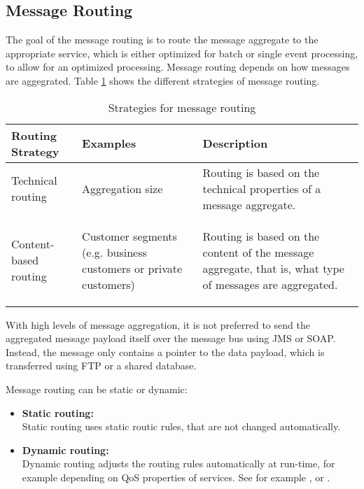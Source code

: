 \subsection{Message Routing}
\label{sec:ch05_router}

The goal of the message routing is to route the message aggregate to the appropriate service, which is either optimized for batch or single event processing, to allow for an optimized processing. Message routing depends on how messages are aggegrated. Table \ref{table:ch05_message_routing} shows the different strategies of message routing.

\begin{table}[htbp]
	\centering
	\begin{tabularx}{\textwidth}{@{} p{3cm} X X @{}}
		\caption{Strategies for message routing}\label{table:ch05_message_routing}\\
		\toprule
		\bfseries Routing Strategy & \bfseries Examples & \bfseries Description\\
		\midrule
		Technical routing & \savespace
		\begin{titemize}
			\item Aggregation size
		\end{titemize} & Routing is based on the technical properties of a message aggregate.\\
		\midrule
		Content-based routing & \savespace
		\begin{titemize}
			\item Customer segments (e.g. business customers or private customers)
		\end{titemize} & Routing is based on the content of the message aggregate, that is, what type of messages are aggregated.\\
		\bottomrule
	\end{tabularx}
\end{table}

With high levels of message aggregation, it is not preferred to send the aggregated message payload itself over the message bus using \acf{JMS} or SOAP. Instead, the message only contains a pointer to the data payload, which is transferred using \acf{FTP} or a shared database.

Message routing can be static or dynamic:
\begin{itemize}
	\item \textbf{Static routing:}\\ 
	Static routing uses static routic rules, that are not changed automatically.
	\item \textbf{Dynamic routing:}\\
	Dynamic routing adjusts the routing rules automatically at run-time, for example depending on \ac{QoS} properties of services. See for example \cite{Bai:2007aa}, \cite{Wu:2008aa} or \cite{Ziyaeva:2008aa}.
\end{itemize}

